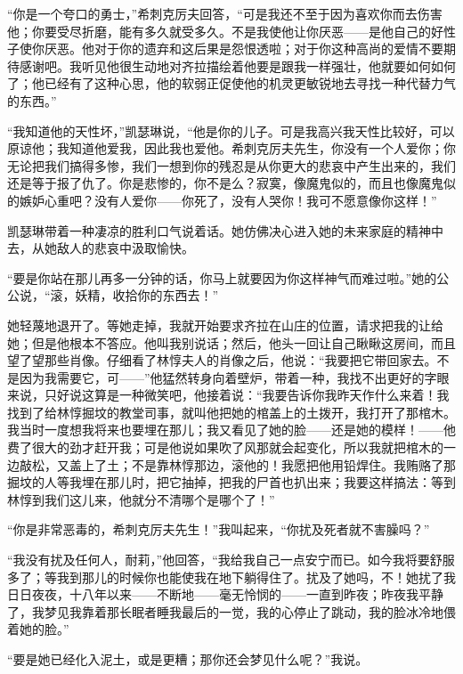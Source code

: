 \par “你是一个夸口的勇士，”希刺克厉夫回答，“可是我还不至于因为喜欢你而去伤害他；你要受尽折磨，能有多久就受多久。不是我使他让你厌恶——是他自己的好性子使你厌恶。他对于你的遗弃和这后果是怨恨透啦；对于你这种高尚的爱情不要期待感谢吧。我听见他很生动地对齐拉描绘着他要是跟我一样强壮，他就要如何如何了；他已经有了这种心思，他的软弱正促使他的机灵更敏锐地去寻找一种代替力气的东西。”
\par “我知道他的天性坏，”凯瑟琳说，“他是你的儿子。可是我高兴我天性比较好，可以原谅他；我知道他爱我，因此我也爱他。希刺克厉夫先生，你没有一个人爱你；你无论把我们搞得多惨，我们一想到你的残忍是从你更大的悲哀中产生出来的，我们还是等于报了仇了。你是悲惨的，你不是么？寂寞，像魔鬼似的，而且也像魔鬼似的嫉妒心重吧？没有人爱你——你死了，没有人哭你！我可不愿意像你这样！”
\par 凯瑟琳带着一种凄凉的胜利口气说着话。她仿佛决心进入她的未来家庭的精神中去，从她敌人的悲哀中汲取愉快。
\par “要是你站在那儿再多一分钟的话，你马上就要因为你这样神气而难过啦。”她的公公说，“滚，妖精，收拾你的东西去！”
\par 她轻蔑地退开了。等她走掉，我就开始要求齐拉在山庄的位置，请求把我的让给她；但是他根本不答应。他叫我别说话；然后，他头一回让自己瞅瞅这房间，而且望了望那些肖像。仔细看了林惇夫人的肖像之后，他说：“我要把它带回家去。不是因为我需要它，可——”他猛然转身向着壁炉，带着一种，我找不出更好的字眼来说，只好说这算是一种微笑吧，他接着说：“我要告诉你我昨天作什么来着！我找到了给林惇掘坟的教堂司事，就叫他把她的棺盖上的土拨开，我打开了那棺木。我当时一度想我将来也要埋在那儿；我又看见了她的脸——还是她的模样！——他费了很大的劲才赶开我；可是他说如果吹了风那就会起变化，所以我就把棺木的一边敲松，又盖上了土；不是靠林惇那边，滚他的！我愿把他用铅焊住。我贿赂了那掘坟的人等我埋在那儿时，把它抽掉，把我的尸首也扒出来；我要这样搞法：等到林惇到我们这儿来，他就分不清哪个是哪个了！”
\par “你是非常恶毒的，希刺克厉夫先生！”我叫起来，“你扰及死者就不害臊吗？”
\par “我没有扰及任何人，耐莉，”他回答，“我给我自己一点安宁而已。如今我将要舒服多了；等我到那儿的时候你也能使我在地下躺得住了。扰及了她吗，不！她扰了我日日夜夜，十八年以来——不断地——毫无怜悯的——一直到昨夜；昨夜我平静了，我梦见我靠着那长眠者睡我最后的一觉，我的心停止了跳动，我的脸冰冷地偎着她的脸。”
\par “要是她已经化入泥土，或是更糟；那你还会梦见什么呢？”我说。
